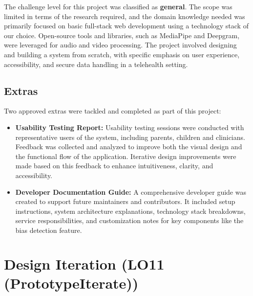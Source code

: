 \documentclass{article}
\begin{document}
The challenge level for this project was classified as \textbf{general}. The scope was limited in terms of the research required, and the domain knowledge needed was primarily focused on basic full-stack web development using a technology stack of our choice. 
Open-source tools and libraries, such as MediaPipe and Deepgram, were leveraged for audio and video processing. The project involved designing and building a system from scratch, with specific emphasis on user experience, accessibility, and secure data handling in a telehealth setting.

\subsection{Extras}

Two approved extras were tackled and completed as part of this project:

\begin{itemize}
    \item \textbf{Usability Testing Report:} Usability testing sessions were conducted with representative users of the system, including parents, children and clinicians. 
    Feedback was collected and analyzed to improve both the visual design and the functional flow of the application. Iterative design improvements were made based on this feedback to enhance intuitiveness, clarity, and accessibility.
    
    \item \textbf{Developer Documentation Guide:} A comprehensive developer guide was created to support future maintainers and contributors. 
    It included setup instructions, system architecture explanations, technology stack breakdowns, service responsibilities, and customization notes for key components like the bias detection feature.
\end{itemize}

\section{Design Iteration (LO11 (PrototypeIterate))}


\end{document}
